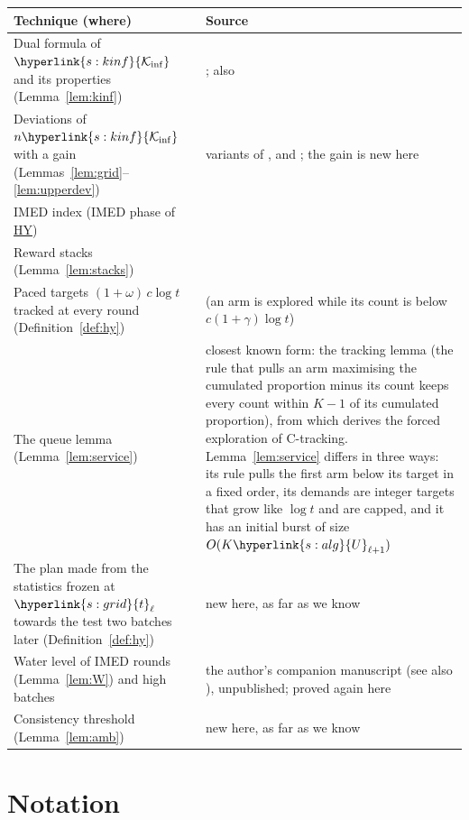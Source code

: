 \documentclass[10pt]{article}
\newcommand{\sy}[2]{{\hyperlink{#1}{#2}}}
\newcommand{\1}{\mathbf{1}}
\newcommand{\Ki}{\sy{s:kinf}{\mathcal K_{\inf}}}
\newcommand{\tl}{\sy{s:grid}{t}}
\newcommand{\HY}{\hyperref[def:hy]{\textup{HY}}}
\newcommand{\Ug}{\sy{s:alg}{U}}
\begin{document}
\begin{center}
\medskip
\begin{tabular}{p{}p{}}
\toprule
Technique (where) & Source \\
\midrule
Dual formula of $\Ki$ and its properties (Lemma~\ref{lem:kinf}) & \citet[(5) and Theorems~5--8]{HT10}; also
\citet{GHMS22} \\
Deviations of $n\Ki$ with a gain (Lemmas~\ref{lem:grid}--\ref{lem:upperdev}) & variants of \citet[Section~5,
Theorem~2]{CGMMS13}, \citet{HT15} and \citet[Section~2.3]{GHMS22}; the gain is new here \\
IMED index (IMED phase of \HY) & \citet[Section~2, Algorithm~1]{HT15} \\
Reward stacks (Lemma~\ref{lem:stacks}) & \citet[Section~4.6]{LS} \\
Paced targets $(1+\omega)\,c\log t$ tracked at every round (Definition~\ref{def:hy}) & \citet[Section~5,
Algorithm~1]{CMP17} (an arm is explored while its count is below $c(1+\gamma)\log t$) \\
The queue lemma (Lemma~\ref{lem:service}) & closest known form: the tracking lemma \citet[Appendix~B.1, Lemma~15]{GK16}
(the rule that pulls an arm maximising the cumulated proportion minus its count keeps every count within $K-1$ of its
cumulated proportion), from which \citet[Lemma~7]{GK16} derives the forced exploration of C-tracking. Lemma~\ref{lem:service}
differs in three ways: its rule pulls the first arm below its target in a fixed order, its demands are integer targets that
grow like $\log t$ and are capped, and it has an initial burst of size $O(K\Ug_{\ell+1})$ \\
The plan made from the statistics frozen at $\tl_\ell$ towards the test two batches later (Definition~\ref{def:hy}) & new here, as far as we know \\
Water level of IMED rounds (Lemma~\ref{lem:W}) and high batches & the author's companion manuscript (see also \citealp{P26}),
unpublished; proved again here \\
Consistency threshold (Lemma~\ref{lem:amb}) & new here, as far as we know \\
\bottomrule
\end{tabular}
\end{center}

\section{Notation}\label{sec:notation}
\end{document}
